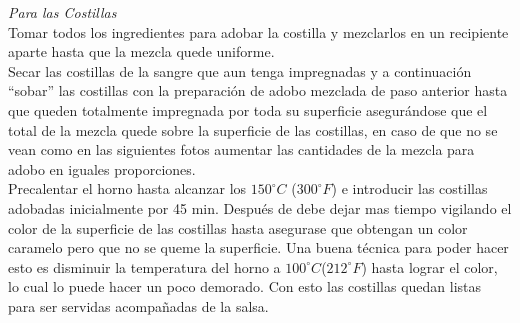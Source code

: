 \emph{Para las Costillas}\\

Tomar todos los ingredientes para adobar la costilla y mezclarlos en un recipiente aparte hasta que la mezcla quede uniforme.\\

Secar las costillas de la sangre que aun tenga impregnadas y a continuación “sobar” las costillas con la preparación de adobo mezclada de paso anterior hasta que queden totalmente impregnada por toda su superficie asegurándose que el total de la mezcla quede sobre la superficie de las costillas, en caso de que no se vean como en las siguientes fotos aumentar las cantidades de la mezcla para adobo en iguales proporciones.\\

Precalentar el horno hasta alcanzar los $150^{\circ}C$ ($300^{\circ}F$) e introducir las costillas adobadas inicialmente por 45 min. Después de debe dejar mas tiempo vigilando el color de la superficie de las costillas hasta asegurase que obtengan un color caramelo pero que no se queme la superficie. Una buena técnica para poder hacer esto es disminuir la temperatura del horno a $100^{\circ}C$($212^{\circ}F$) hasta lograr el color, lo cual lo puede hacer un poco demorado. Con esto las costillas quedan listas para ser servidas acompañadas de la salsa.\\
